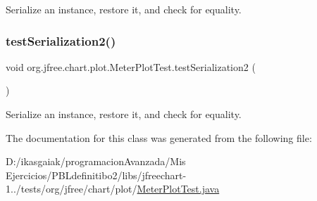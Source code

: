 Serialize an instance, restore it, and check for equality. \mbox{\label{classorg_1_1jfree_1_1chart_1_1plot_1_1_meter_plot_test_a25dc3ccec0eed6c45fd54c810e7d9f74}} 
\subsubsection{\texorpdfstring{test\+Serialization2()}{testSerialization2()}}
{\footnotesize\ttfamily void org.\+jfree.\+chart.\+plot.\+Meter\+Plot\+Test.\+test\+Serialization2 (\begin{DoxyParamCaption}{ }\end{DoxyParamCaption})}

Serialize an instance, restore it, and check for equality. 

The documentation for this class was generated from the following file\+:\begin{DoxyCompactItemize}
\item 
D\+:/ikasgaiak/programacion\+Avanzada/\+Mis Ejercicios/\+P\+B\+Ldefinitibo2/libs/jfreechart-\/1../tests/org/jfree/chart/plot/\mbox{\hyperlink{_meter_plot_test_8java}{Meter\+Plot\+Test.\+java}}\end{DoxyCompactItemize}
